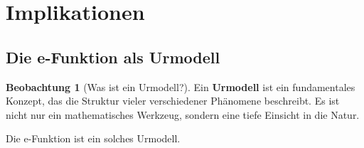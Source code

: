 ﻿\documentclass[a4paper,12pt]{report}
\theoremstyle{definition}
\newtheorem{beobachtung}{Beobachtung}
\begin{document}
	\section{Implikationen}
	
	\subsection{Die e-Funktion als Urmodell}
	
	\begin{beobachtung}[Was ist ein Urmodell?]
		Ein \textbf{Urmodell} ist ein fundamentales Konzept, das die Struktur vieler verschiedener Phänomene beschreibt. Es ist nicht nur ein mathematisches Werkzeug, sondern eine tiefe Einsicht in die Natur.
		
		Die e-Funktion ist ein solches Urmodell.
	\end{beobachtung}
	
\end{document}
